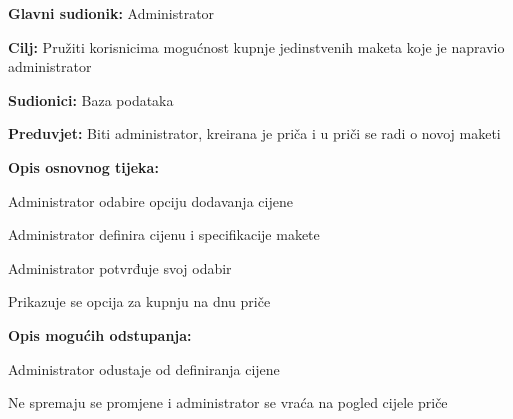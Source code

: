					\noindent {}
					\begin{packed_item}
						
						\item \textbf{Glavni sudionik: }Administrator
						\item  \textbf{Cilj:} Pružiti korisnicima mogućnost kupnje jedinstvenih maketa koje je napravio administrator
						\item  \textbf{Sudionici:} Baza podataka
						\item  \textbf{Preduvjet:} Biti administrator, kreirana je priča i u priči se radi o novoj maketi
						\item  \textbf{Opis osnovnog tijeka:}
						
						\item[] \begin{packed_enum}
							
							\item Administrator odabire opciju dodavanja cijene
							\item Administrator definira cijenu i specifikacije makete
							\item Administrator potvrđuje svoj odabir
							\item Prikazuje se opcija za kupnju na dnu priče
						\end{packed_enum}
						\item  \textbf{Opis mogućih odstupanja:}
					
						\item[] \begin{packed_item}
							
							\item[2.a] Administrator odustaje od definiranja cijene
							
							\item[] \begin{packed_enum}
								
								\item Ne spremaju se promjene i administrator se vraća na pogled cijele priče
								
							\end{packed_enum}
							
						\end{packed_item}
					\end{packed_item}
				
